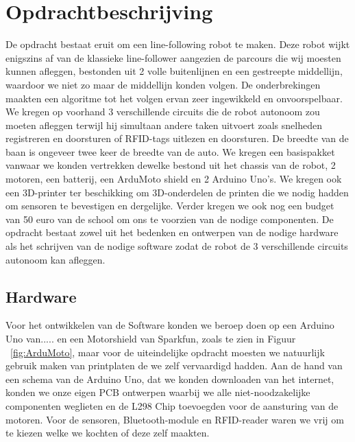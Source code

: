\chapter{Opdrachtbeschrijving}
\label{chap:Opdrachtbeschrijving}
De opdracht bestaat eruit om een line-following robot te maken. Deze robot wijkt enigszins af van de klassieke line-follower aangezien de parcours die wij moesten kunnen afleggen, bestonden uit 2 volle buitenlijnen en een gestreepte middellijn, waardoor we niet zo maar de middellijn konden volgen. De onderbrekingen maakten een algoritme tot het volgen ervan zeer ingewikkeld en onvoorspelbaar. We kregen op voorhand 3 verschillende circuits die de robot autonoom zou moeten afleggen terwijl hij simultaan andere taken uitvoert zoals snelheden registreren en doorsturen of RFID-tags uitlezen en doorsturen. De breedte van de baan is ongeveer twee keer de breedte van de auto. We kregen een basispakket vanwaar we konden vertrekken dewelke bestond uit het chassis van de robot, 2 motoren, een batterij, een ArduMoto shield en 2 Arduino Uno's. We kregen ook een 3D-printer ter beschikking om 3D-onderdelen de printen die we nodig hadden om sensoren te bevestigen en dergelijke. Verder kregen we ook nog een budget van 50 euro van de school om ons te voorzien van de nodige componenten. De opdracht bestaat zowel uit het bedenken en ontwerpen van de nodige hardware als het schrijven van de nodige software zodat de robot de 3 verschillende circuits autonoom kan afleggen.
\section{Hardware}
Voor het ontwikkelen van de Software konden we beroep doen op een Arduino Uno van..... en een Motorshield van Sparkfun, zoals te zien in Figuur ~\ref{fig:ArduMoto}, maar voor de uiteindelijke opdracht moesten we natuurlijk gebruik maken van printplaten de we zelf vervaardigd hadden. Aan de hand van een schema van de Arduino Uno, dat we konden downloaden van het internet, konden we onze eigen PCB ontwerpen waarbij we alle niet-noodzakelijke componenten weglieten en de L298 Chip toevoegden voor de aansturing van de motoren. Voor de sensoren, Bluetooth-module en RFID-reader waren we vrij om te kiezen welke we kochten of deze zelf maakten.




